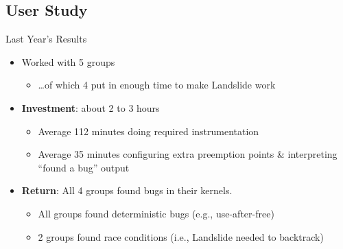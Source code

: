 \documentclass[xcolor=dvipsnames]{beamer}
\begin{document}
%


\subsection{User Study}

\begin{frame}{Last Year's Results}
	\begin{itemize}
		\item Worked with 5 groups
		\begin{itemize}
			\item \dots{}of which 4 put in enough time to make Landslide work
		\end{itemize}
		\linegap
		\item {\bf Investment}: about 2 to 3 hours
		\begin{itemize}
			\item Average 112 minutes doing required instrumentation
			\item Average 35 minutes configuring extra preemption points \& interpreting ``found a bug'' output
		\end{itemize}
		\pause
		\linegap
		\item {\bf Return}: All 4 groups found bugs in their kernels.
		\begin{itemize}
			\item All groups found deterministic bugs (e.g., use-after-free)
			\item 2 groups found race conditions (i.e., Landslide needed to backtrack)
		\end{itemize}
	\end{itemize}
\end{frame}
\end{document}
